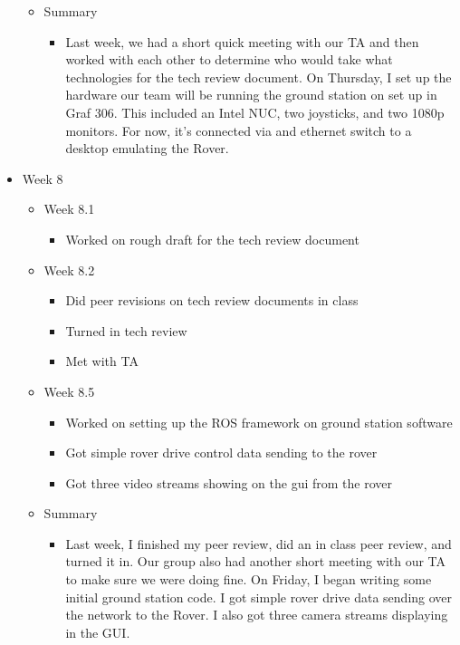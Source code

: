 \begin{itemize}
\begin{itemize}
    \item Summary
      \begin{itemize}
      \item Last week, we had a short quick meeting with our TA and then worked with each other to determine who would take what technologies for the tech review document. On Thursday, I set up the hardware our team will be running the ground station on set up in Graf 306. This included an Intel NUC, two joysticks, and two 1080p monitors. For now, it's connected via and ethernet switch to a desktop emulating the Rover. 
      \end{itemize}
	\end{itemize}

\item Week 8
	\begin{itemize}
	\item Week 8.1
      \begin{itemize}
      \item Worked on rough draft for the tech review document 
      \end{itemize}
	\item Week 8.2
      \begin{itemize}
      \item Did peer revisions on tech review documents in class 
      \item Turned in tech review 
      \item Met with TA
      \end{itemize}
	\item Week 8.5
      \begin{itemize}
      \item Worked on setting up the ROS framework on ground station software 
      \item Got simple rover drive control data sending to the rover 
      \item Got three video streams showing on the gui from the rover 
      \end{itemize}
    
    \item Summary
      \begin{itemize}
      \item Last week, I finished my peer review, did an in class peer review, and turned it in. Our group also had another short meeting with our TA to make sure we were doing fine. On Friday, I began writing some initial ground station code. I got simple rover drive data sending over the network to the Rover. I also got three camera streams displaying in the GUI. 
      \end{itemize}
	\end{itemize}


\end{itemize}
